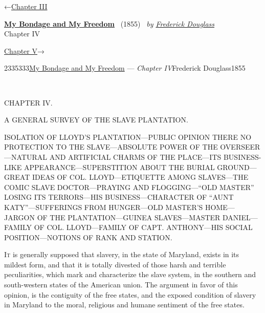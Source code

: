 \hypertarget{headerContainer}{}
\hypertarget{navigationHeader}{}
\protect\hypertarget{headerprevious}{}{←\href{/wiki/My_Bondage_and_My_Freedom_(1855)/Chapter_III}{Chapter
III}}

\textbf{\protect\hypertarget{header_title_text}{}{\href{/wiki/My_Bondage_and_My_Freedom_(1855)}{My
Bondage and My Freedom}}} ~(1855)~ \emph{by
\href{/wiki/Author:Frederick_Douglass}{\protect\hypertarget{header_author_text}{}{{Frederick
Douglass}}}}\\
\protect\hypertarget{header_section_text}{}{Chapter IV}

\protect\hypertarget{headernext}{}{\href{/wiki/My_Bondage_and_My_Freedom_(1855)/Chapter_V}{Chapter
V}→}

\hypertarget{navigationNotes}{}

\hypertarget{ws-data}{}
\protect\hypertarget{ws-article-id}{}{2335333}\protect\hypertarget{ws-title}{}{\href{/wiki/My_Bondage_and_My_Freedom_(1855)}{My
Bondage and My Freedom} --- \emph{Chapter
IV}}\protect\hypertarget{ws-author}{}{Frederick
Douglass}\protect\hypertarget{ws-year}{}{1855}

{\protect\hypertarget{61}{}{}}

~

{CHAPTER IV.}

A GENERAL SURVEY OF THE SLAVE PLANTATION.

{ISOLATION OF LLOYD'S PLANTATION---PUBLIC OPINION THERE NO PROTECTION TO
THE SLAVE---ABSOLUTE POWER OF THE OVERSEER---NATURAL AND ARTIFICIAL
CHARMS OF THE PLACE---ITS BUSINESS-LIKE APPEARANCE---SUPERSTITION ABOUT
THE BURIAL GROUND---GREAT IDEAS OF COL. LLOYD---ETIQUETTE AMONG
SLAVES---THE COMIC SLAVE DOCTOR---PRAYING AND FLOGGING---``OLD MASTER''
LOSING ITS TERRORS---HIS BUSINESS---CHARACTER OF ``AUNT
KATY''---SUFFERINGS FROM HUNGER---OLD MASTER'S HOME---JARGON OF THE
PLANTATION---GUINEA SLAVES---MASTER DANIEL---FAMILY OF COL.
LLOYD---FAMILY OF CAPT. ANTHONY---HIS SOCIAL POSITION---NOTIONS OF RANK
AND STATION.}

\textsc{It} is generally supposed that slavery, in the state of
Maryland, exists in its mildest form, and that it is totally divested of
those harsh and terrible peculiarities, which mark and characterize the
slave system, in the southern and south-western states of the American
union. The argument in favor of this opinion, is the contiguity of the
free states, and the exposed condition of slavery in Maryland to the
moral, religious and humane sentiment of the free states.

